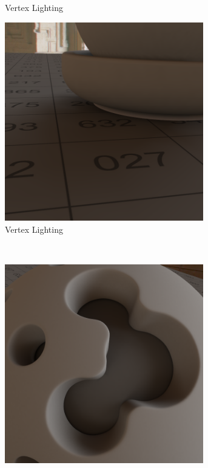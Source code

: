 \begin{figure}[H]
\begin{subfigure}[t]{0.5\textwidth}
				\caption{Vertex Lighting}
				\label{subfig:irrmap-shaderball-e3-vmap}
			\end{subfigure}
			\begin{subfigure}[t]{0.5\textwidth}
				\center
				\includegraphics[width=0.95\textwidth]{pic/irrmap-shaderball_e4-vmap.png}
				\caption{Vertex Lighting}
				\label{subfig:irrmap-shaderball-e4-vmap}
			\end{subfigure}
			\medskip \\
			\begin{subfigure}[t]{0.5\textwidth}
				\center
				\includegraphics[width=0.95\textwidth]{pic/irrmap-shaderball_e3-irrmap.png}

\end{subfigure}
\end{figure}
